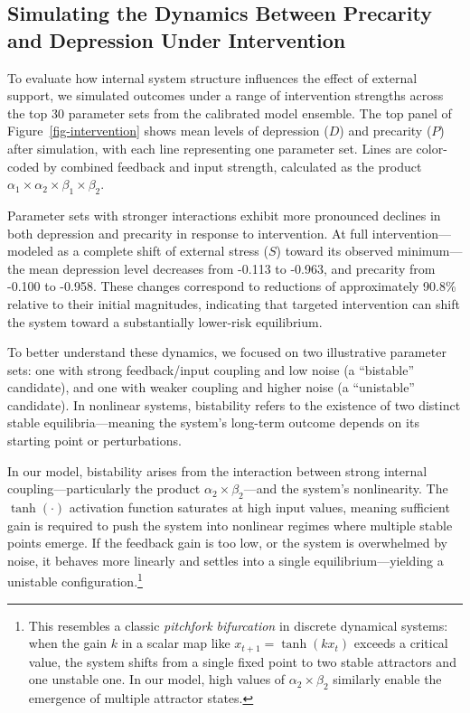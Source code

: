 \documentclass[
]{article}
\begin{document}
\subsection{Simulating the Dynamics Between Precarity and Depression
Under
Intervention}\label{simulating-the-dynamics-between-precarity-and-depression-under-intervention}

To evaluate how internal system structure influences the effect of
external support, we simulated outcomes under a range of intervention
strengths across the top 30 parameter sets from the calibrated model
ensemble. The top panel of Figure~\ref{fig-intervention} shows mean
levels of depression (\(D\)) and precarity (\(P\)) after simulation,
with each line representing one parameter set. Lines are color-coded by
combined feedback and input strength, calculated as the product
\(\alpha_1 \times \alpha_2 \times \beta_1 \times \beta_2\).

Parameter sets with stronger interactions exhibit more pronounced
declines in both depression and precarity in response to intervention.
At full intervention---modeled as a complete shift of external stress
(\(S\)) toward its observed minimum---the mean depression level
decreases from -0.113 to -0.963, and precarity from -0.100 to -0.958.
These changes correspond to reductions of approximately 90.8\% relative
to their initial magnitudes, indicating that targeted intervention can
shift the system toward a substantially lower-risk equilibrium.

To better understand these dynamics, we focused on two illustrative
parameter sets: one with strong feedback/input coupling and low noise (a
``bistable'' candidate), and one with weaker coupling and higher noise
(a ``unistable'' candidate). In nonlinear systems, bistability refers to
the existence of two distinct stable equilibria---meaning the system's
long-term outcome depends on its starting point or perturbations.

In our model, bistability arises from the interaction between strong
internal coupling---particularly the product
\(\alpha_2 \times \beta_2\)---and the system's nonlinearity. The
\(\tanh(\cdot)\) activation function saturates at high input values,
meaning sufficient gain is required to push the system into nonlinear
regimes where multiple stable points emerge. If the feedback gain is too
low, or the system is overwhelmed by noise, it behaves more linearly and
settles into a single equilibrium---yielding a unistable
configuration.\footnote{This resembles a classic \emph{pitchfork
  bifurcation} in discrete dynamical systems: when the gain \(k\) in a
  scalar map like \(x_{t+1} = \tanh(k x_t)\) exceeds a critical value,
  the system shifts from a single fixed point to two stable attractors
  and one unstable one. In our model, high values of
  \(\alpha_2 \times \beta_2\) similarly enable the emergence of multiple
  attractor states.}
\end{document}
